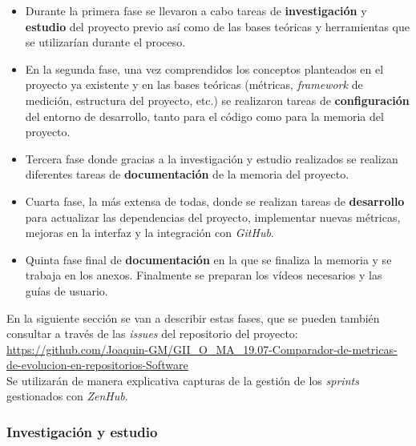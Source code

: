 \begin{itemize}
	\item Durante la primera fase se llevaron a cabo tareas de \textbf{investigación} y \textbf{estudio} del proyecto previo\cite{TFGPrevio} así como de las bases teóricas y herramientas que se utilizarían durante el proceso.
	
	\item En la segunda fase, una vez comprendidos los conceptos planteados en el proyecto ya existente y en las bases teóricas (métricas, \textit{framework}  de medición, estructura del proyecto, etc.) se realizaron tareas de \textbf{configuración} del entorno de desarrollo, tanto para el código como para la memoria del proyecto.
	
	\item Tercera fase donde gracias a la investigación y estudio realizados se realizan diferentes tareas de \textbf{documentación} de la memoria del proyecto.
	
	\item Cuarta fase, la más extensa de todas, donde se realizan tareas de \textbf{desarrollo} para actualizar las dependencias del proyecto, implementar nuevas métricas, mejoras en la interfaz y la integración con \textit{GitHub}.
	
	\item Quinta fase final de \textbf{documentación} en la que se finaliza la memoria y se trabaja en los anexos. Finalmente se preparan los vídeos necesarios y las guías de usuario.
\end{itemize}

En la siguiente sección se van a describir estas fases, que se pueden también consultar a través de las \textit{issues} del repositorio del proyecto:\\

\url{https://github.com/Joaquin-GM/GII_O_MA_19.07-Comparador-de-metricas-de-evolucion-en-repositorios-Software} \\

Se utilizarán de manera explicativa capturas de la gestión de los \textit{sprints} gestionados con \textit{ZenHub}.



\subsubsection{Investigación y estudio}

